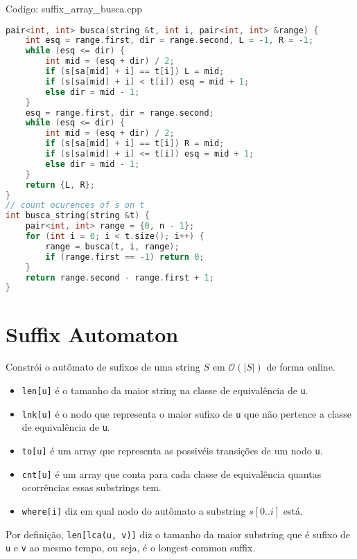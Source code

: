 \documentclass[10pt, a4paper, oneside]{book}
\begin{document}
Codigo: suffix\_array\_busca.cpp

\begin{lstlisting}[language=C++]
pair<int, int> busca(string &t, int i, pair<int, int> &range) {
    int esq = range.first, dir = range.second, L = -1, R = -1;
    while (esq <= dir) {
        int mid = (esq + dir) / 2;
        if (s[sa[mid] + i] == t[i]) L = mid;
        if (s[sa[mid] + i] < t[i]) esq = mid + 1;
        else dir = mid - 1;
    }
    esq = range.first, dir = range.second;
    while (esq <= dir) {
        int mid = (esq + dir) / 2;
        if (s[sa[mid] + i] == t[i]) R = mid;
        if (s[sa[mid] + i] <= t[i]) esq = mid + 1;
        else dir = mid - 1;
    }
    return {L, R};
}
// count ocurences of s on t
int busca_string(string &t) {
    pair<int, int> range = {0, n - 1};
    for (int i = 0; i < t.size(); i++) {
        range = busca(t, i, range);
        if (range.first == -1) return 0;
    }
    return range.second - range.first + 1;
}\end{lstlisting}
\hfill

\section{Suffix Automaton}


Constrói o autômato de sufixos de uma string $S$ em $\mathcal{O}(|S|)$ de forma online.  



\begin{itemize}
\item \texttt{len[u]} é o tamanho da maior string na classe de equivalência de \texttt{u}.
\item \texttt{lnk[u]} é o nodo que representa o maior sufixo de \texttt{u} que não pertence a classe de equivalência de \texttt{u}.
\item \texttt{to[u]} é um array que representa as possivéis transições de um nodo \texttt{u}.
\item \texttt{cnt[u]} é um array que conta para cada classe de equivalência quantas ocorrências essas substrings tem.
\item \texttt{where[i]} diz em qual nodo do autômato a substring $s[0..i]$ está.
\end{itemize}



Por definição, \texttt{len[lca(u, v)]} diz o tamanho da maior substring que é sufixo de \texttt{u} e \texttt{v} ao mesmo tempo, ou seja, é o longest common suffix.
\end{document}
